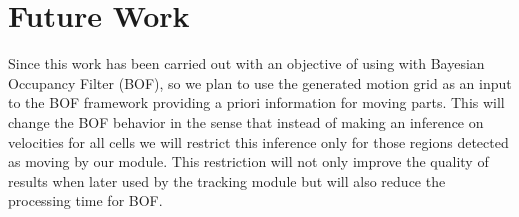 \section{Future Work}
Since this work has been carried out with an objective of using with Bayesian Occupancy Filter (BOF), so we plan to use the generated motion grid as an input to the BOF framework providing a priori information for moving parts. This will change the BOF behavior in the sense that instead of making an inference on velocities for all cells we will restrict this inference only for those regions detected as moving by our module. This restriction will not only improve the quality of results when later used by the tracking module but will also reduce the processing time for BOF.